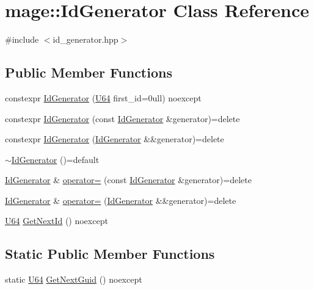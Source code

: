 \hypertarget{classmage_1_1_id_generator}{}\section{mage\+:\+:Id\+Generator Class Reference}
\label{classmage_1_1_id_generator}


{\ttfamily \#include $<$id\+\_\+generator.\+hpp$>$}

\subsection*{Public Member Functions}
\begin{DoxyCompactItemize}
\item 
constexpr \hyperlink{classmage_1_1_id_generator_aabc8fb01d9c7be4ecc3ae78410b06563}{Id\+Generator} (\hyperlink{namespacemage_a6672cf3c861707ce4a3235a3eb43941d}{U64} first\+\_\+id=0ull) noexcept
\item 
constexpr \hyperlink{classmage_1_1_id_generator_af9031d6e7bdec72d7d46c975d3ff2476}{Id\+Generator} (const \hyperlink{classmage_1_1_id_generator}{Id\+Generator} \&generator)=delete
\item 
constexpr \hyperlink{classmage_1_1_id_generator_a1f1da4e89427aaad06adb665b95ca70a}{Id\+Generator} (\hyperlink{classmage_1_1_id_generator}{Id\+Generator} \&\&generator)=delete
\item 
\hyperlink{classmage_1_1_id_generator_a70161ab5b10294ebba1ace7a3b0f8d31}{$\sim$\+Id\+Generator} ()=default
\item 
\hyperlink{classmage_1_1_id_generator}{Id\+Generator} \& \hyperlink{classmage_1_1_id_generator_adf4539050d910996e914df51f22236c6}{operator=} (const \hyperlink{classmage_1_1_id_generator}{Id\+Generator} \&generator)=delete
\item 
\hyperlink{classmage_1_1_id_generator}{Id\+Generator} \& \hyperlink{classmage_1_1_id_generator_aeb8bfd849689d74eb450b0c1c2044086}{operator=} (\hyperlink{classmage_1_1_id_generator}{Id\+Generator} \&\&generator)=delete
\item 
\hyperlink{namespacemage_a6672cf3c861707ce4a3235a3eb43941d}{U64} \hyperlink{classmage_1_1_id_generator_ae51ebc69faac9974553b7c647981dc57}{Get\+Next\+Id} () noexcept
\end{DoxyCompactItemize}
\subsection*{Static Public Member Functions}
\begin{DoxyCompactItemize}
\item 
static \hyperlink{namespacemage_a6672cf3c861707ce4a3235a3eb43941d}{U64} \hyperlink{classmage_1_1_id_generator_af6df2ba2fb7172e7753c69a4aec1e6bf}{Get\+Next\+Guid} () noexcept
\end{DoxyCompactItemize}
